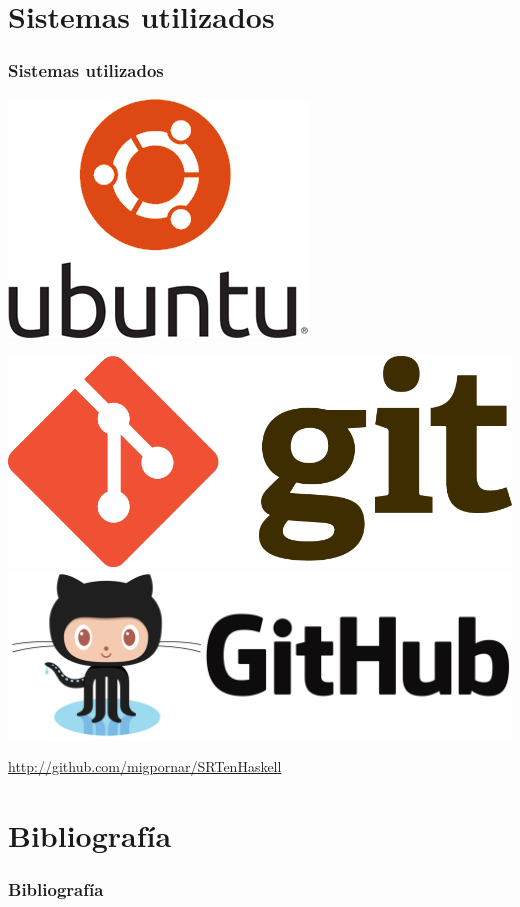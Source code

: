 \documentclass{beamer}
\begin{document}
\section{Sistemas utilizados}

\begin{frame}
  \frametitle{Sistemas utilizados}
  \begin{center}
    \includegraphics[width=.3\textwidth]{ubuntu.png}
    \hspace{.2cm}
    \hspace{.2cm}
  \end{center}

  \begin{center}
    \includegraphics[width=.3\textwidth]{git.png}
    \hspace{.2cm}
    \includegraphics[width=.4\textwidth]{github.png}
  \end{center}

  \begin{block}{}
    \begin{center}
      \url{http://github.com/migpornar/SRTenHaskell}
    \end{center}
  \end{block}
\end{frame}

\section{Bibliografía}

\begin{frame}[allowframebreaks]
        \frametitle{Bibliografía}
\nocite{*}


\end{frame}
\end{document}
